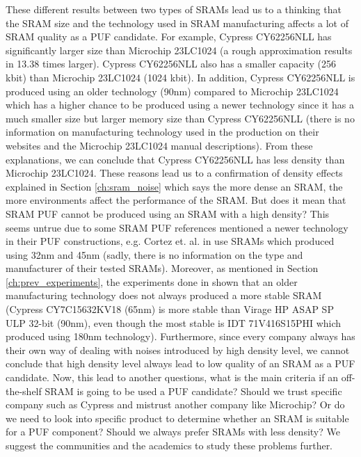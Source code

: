 These different results between two types of SRAMs lead us to a thinking that the SRAM size and the technology used in SRAM manufacturing affects a lot of SRAM quality as a PUF candidate. For example, Cypress CY62256NLL has significantly larger size than Microchip 23LC1024 (a rough approximation results in 13.38 times larger). Cypress CY62256NLL also has a smaller capacity (256 kbit) than Microchip 23LC1024 (1024 kbit). In addition, Cypress CY62256NLL is produced using an older technology (90nm) compared to Microchip 23LC1024 which has a higher chance to be produced using a newer technology since it has a much smaller size but larger memory size than Cypress CY62256NLL (there is no information on manufacturing technology used in the production on their websites and the Microchip 23LC1024 manual descriptions). From these explanations, we can conclude that Cypress CY62256NLL has less density than Microchip 23LC1024. These reasons lead us to a confirmation of density effects  explained in Section \ref{ch:sram_noise} which says the more dense an SRAM, the more environments affect the performance of the SRAM. But does it mean that SRAM PUF cannot be produced using an SRAM with a high density? This seems untrue due to some SRAM PUF references mentioned a newer technology in their PUF constructions, e.g. Cortez et. al. in \cite{7102498} use SRAMs which produced using 32nm and 45nm (sadly, there is no information on the type and manufacturer of their tested SRAMs). Moreover, as mentioned in Section \ref{ch:prev_experiments}, the experiments done in \cite{Schrijen:2012:CAS:2492708.2493033} shown that an older manufacturing technology does not always produced a more stable SRAM (Cypress CY7C15632KV18 (65nm) is more stable than Virage HP ASAP SP ULP 32-bit (90nm), even though the most stable is IDT 71V416S15PHI which produced using 180nm technology).
Furthermore, since every company always has their own way of dealing with noises introduced by high density level, we cannot conclude that high density level always lead to low quality of an SRAM as a PUF candidate. Now, this lead to another questions, what is the main criteria if an off-the-shelf SRAM is going to be used a PUF candidate? Should we trust specific company such as Cypress and mistrust another company like Microchip? Or do we need to look into specific product to determine whether an SRAM is suitable for a PUF component? Should we always prefer SRAMs with less density?
We suggest the communities and the academics to study these problems further.

